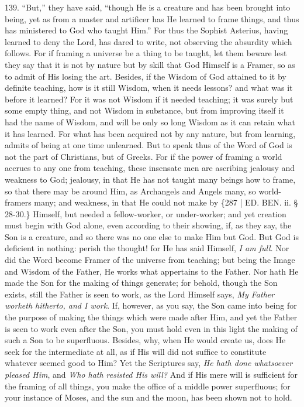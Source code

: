 139. ``But,'' they have said, ``though
He is a creature and has been brought into being, yet as from a master
and artificer has He learned to frame things, and thus has ministered
to God who taught Him.'' For thus the Sophist Asterius, having learned
to deny the Lord, has dared to write, not observing the absurdity
which follows. For if framing a universe be a thing to be taught, let
them beware lest they say that it is not by nature but by skill that
God Himself is a Framer, so as to admit of His losing the art.
Besides, if the Wisdom of God attained to it by definite teaching, how
is it still Wisdom, when it needs lessons? and what was it before it
learned? For it was not Wisdom if it needed teaching; it was surely
but some empty thing, and not Wisdom in substance, but from improving
itself it had the name of Wisdom, and will be only so long Wisdom as
it can retain what it has learned. For what has been acquired not by
any nature, but from learning, admits of being at one time unlearned.
But to speak thus of the Word of God is not the part of Christians,
but of Greeks. For if the power of framing a world accrues to any one
from teaching, these insensate men are ascribing jealousy and weakness
to God; jealousy, in that He has not taught many beings how to frame,
so that there may be around Him, as Archangels and Angels many, so
world-framers many; and weakness, in that He could not make by \{287 |
ED.
BEN.
ii. § 28-30.\} Himself, but needed a fellow-worker, or under-worker; and
yet creation must begin with God alone, even according to their
showing, if, as they say, the Son is a creature, and so there was no
one else to make Him but God. But God is deficient in nothing: perish
the thought! for He has said Himself, \emph{I am full}. Nor did the
Word become Framer of the universe from teaching; but being the Image
and Wisdom of the Father, He works what appertains to the Father. Nor
hath He made the Son for the making of things generate; for behold,
though the Son exists, still the Father is seen to work, as the Lord
Himself says, \emph{My Father worketh hitherto, and I work}. If,
however, as you say, the Son came into being for the purpose of making
the things which were made after Him, and yet the Father is seen to
work even after the Son, you must hold even in this light the making
of such a Son to be superfluous. Besides, why, when He would create
us, does He seek for the intermediate at all, as if His will did not
suffice to constitute whatever seemed good to Him? Yet the Scriptures
say, \emph{He hath done whatsoever pleased Him}, and \emph{Who hath
resisted His will?} And if His mere will is sufficient for the
framing of all things, you make the office of a middle power
superfluous; for your instance of Moses, and the sun and the moon, has
been shown not to hold.

